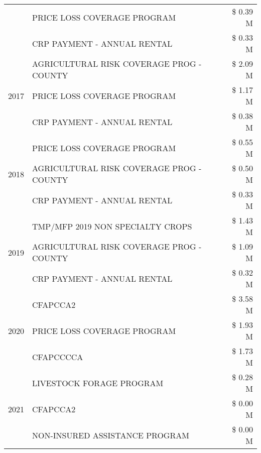 \begin{tabular}{llr}
 & PRICE LOSS COVERAGE PROGRAM & \$ 0.39 M \\
 & CRP PAYMENT - ANNUAL RENTAL & \$ 0.33 M \\
\cline{1-3}
\multirow[t]{3}{*}{2017} & AGRICULTURAL RISK COVERAGE PROG - COUNTY & \$ 2.09 M \\
 & PRICE LOSS COVERAGE PROGRAM & \$ 1.17 M \\
 & CRP PAYMENT - ANNUAL RENTAL & \$ 0.38 M \\
\cline{1-3}
\multirow[t]{3}{*}{2018} & PRICE LOSS COVERAGE PROGRAM & \$ 0.55 M \\
 & AGRICULTURAL RISK COVERAGE PROG - COUNTY & \$ 0.50 M \\
 & CRP PAYMENT - ANNUAL RENTAL & \$ 0.33 M \\
\cline{1-3}
\multirow[t]{3}{*}{2019} & TMP/MFP 2019 NON SPECIALTY CROPS & \$ 1.43 M \\
 & AGRICULTURAL RISK COVERAGE PROG - COUNTY & \$ 1.09 M \\
 & CRP PAYMENT - ANNUAL RENTAL & \$ 0.32 M \\
\cline{1-3}
\multirow[t]{3}{*}{2020} & CFAPCCA2 & \$ 3.58 M \\
 & PRICE LOSS COVERAGE PROGRAM & \$ 1.93 M \\
 & CFAPCCCCA & \$ 1.73 M \\
\cline{1-3}
\multirow[t]{3}{*}{2021} & LIVESTOCK FORAGE PROGRAM & \$ 0.28 M \\
 & CFAPCCA2 & \$ 0.00 M \\
 & NON-INSURED ASSISTANCE PROGRAM & \$ 0.00 M \\
\cline{1-3}
\bottomrule
\end{tabular}
